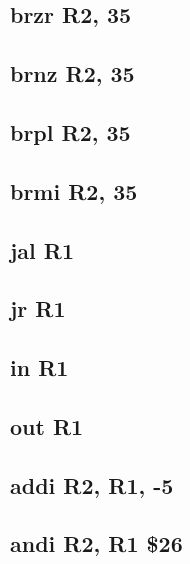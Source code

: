 \documentclass{article}
\begin{document}
    \subsection{brzr R2, 35} \label{brzr_sequence}
        
    \subsection{brnz R2, 35} \label{brnz_sequence}
        
    \subsection{brpl R2, 35} \label{brpl_sequence}
        
    \subsection{brmi R2, 35} \label{brmi_sequence}
        
    \subsection{jal R1} \label{jal_sequence}
        
    \subsection{jr R1} \label{jr_sequence}
        
    \subsection{in R1} \label{in_sequence}
        
    \subsection{out R1} \label{out_sequence}
        
    \subsection{addi R2, R1, -5} \label{addi_sequence}
        
    \subsection{andi R2, R1 \$26} \label{andi_sequence}
        
\end{document}
